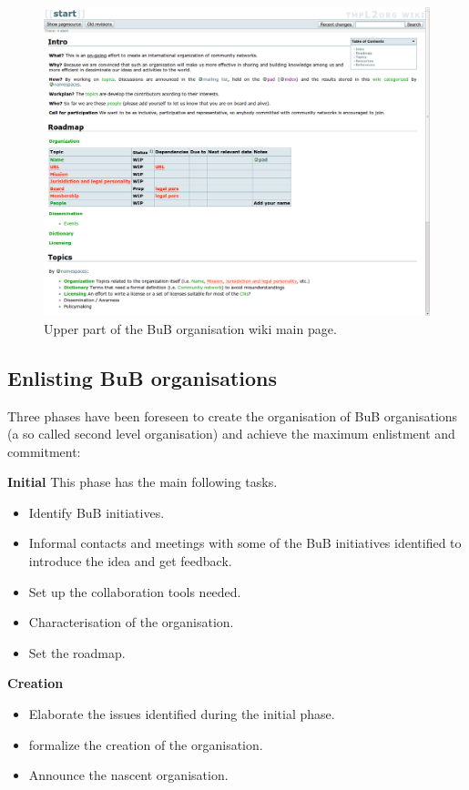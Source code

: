 \begin{figure}[H]
  \centering
  \includegraphics[width=0.95\linewidth]{sect2/figures/wiki_l2org.png}
  \caption[BuB organisation wiki]{Upper part of the BuB organisation wiki main page.}
  \label{fig:l2org_wiki}
\end{figure}


\subsection{Enlisting BuB organisations}

Three phases have been foreseen to create the organisation of BuB organisations (a so called second level organisation) and achieve the maximum enlistment and commitment:

\textbf{Initial}
This phase has the main following tasks.
\begin{itemize}
  \setlength{\itemindent}{2em}
  \item Identify BuB initiatives.
  \item Informal contacts and meetings with some of the BuB initiatives identified to introduce the idea and get feedback.
  \item Set up the collaboration tools needed.
  \item Characterisation of the organisation.
  \item Set the roadmap.
\end{itemize}


\textbf{Creation}
\begin{itemize}
  \setlength{\itemindent}{2em}
  \item Elaborate the issues identified during the initial phase.
  \item formalize the creation of the organisation.
  \item Announce the nascent organisation.
\end{itemize}


